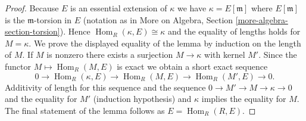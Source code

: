 \documentclass[10pt,a4paper]{amsart}
\theoremstyle{plain}
\theoremstyle{definition}
\theoremstyle{remark}
\numberwithin{equation}{subsection}
\def\Hom{\mathop{\mathrm{Hom}}\nolimits}
\begin{document}
\begin{proof}
Because $E$ is an essential extension of $\kappa$ we have
$\kappa = E[\mathfrak m]$ where $E[\mathfrak m]$ is the
$\mathfrak m$-torsion in $E$ (notation as in More on Algebra, Section
\ref{more-algebra-section-torsion}).
Hence $\Hom_R(\kappa, E) \cong \kappa$ and the equality of lengths
holds for $M = \kappa$. We prove the displayed equality of the lemma
by induction on the length of $M$. If $M$ is nonzero there exists a surjection
$M \to \kappa$ with kernel $M'$. Since the functor $M \mapsto \Hom_R(M, E)$
is exact we obtain a short exact sequence
$$
0 \to \Hom_R(\kappa, E) \to \Hom_R(M, E) \to \Hom_R(M', E) \to 0.
$$
Additivity of length for this sequence and the sequence
$0 \to M' \to M \to \kappa \to 0$ and the equality for $M'$ (induction
hypothesis) and $\kappa$ implies the equality for $M$.
The final statement of the lemma follows as $E = \Hom_R(R, E)$.
\end{proof}
\end{document}
